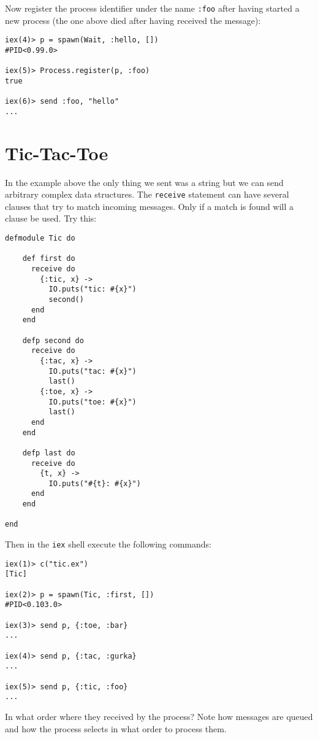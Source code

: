 \documentclass[a4paper,11pt]{article}
\begin{document}
Now register the process identifier under the name {\tt :foo} after having started a new process (the one above died after having received the message):

\begin{verbatim}
iex(4)> p = spawn(Wait, :hello, [])
#PID<0.99.0>

iex(5)> Process.register(p, :foo)
true

iex(6)> send :foo, "hello"
...
\end{verbatim}



\section{Tic-Tac-Toe}

In the example above the only thing we sent was a string but
we can send arbitrary complex data structures. The {\tt receive}
statement can have several clauses that try to match incoming
messages. Only if a match is found will a clause be used. Try this:

\begin{verbatim}
defmodule Tic do

    def first do
      receive do
        {:tic, x} ->
          IO.puts("tic: #{x}")
          second()
      end
    end
    
    defp second do
      receive do
        {:tac, x} ->
          IO.puts("tac: #{x}")
          last()
        {:toe, x} ->
          IO.puts("toe: #{x}")
          last()
      end
    end

    defp last do
      receive do
        {t, x} ->
          IO.puts("#{t}: #{x}")
      end
    end

end
\end{verbatim}

Then in the {\tt iex} shell execute the following commands:

\begin{verbatim}
iex(1)> c("tic.ex")
[Tic]

iex(2)> p = spawn(Tic, :first, [])
#PID<0.103.0>

iex(3)> send p, {:toe, :bar}
...

iex(4)> send p, {:tac, :gurka}
...

iex(5)> send p, {:tic, :foo}
...
\end{verbatim}

In what order where they received by the process? Note how messages
are queued and how the process selects in what order to process them.
\end{document}
